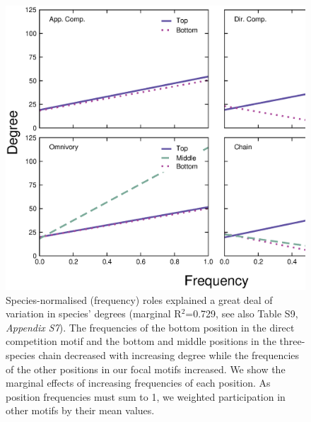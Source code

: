 \documentclass[12pt]{article}
\begin{document}
    \begin{figure}[ht!]
        \centering
        \includegraphics[width=\textwidth]{figures/positions_vs_Deg_freq.eps}
        \caption{Species-normalised (frequency) roles explained a great deal of variation in species' degrees (marginal R$^2$=0.729, see also Table S9, \emph{Appendix S7}). The frequencies of the bottom position in the direct competition motif and the bottom and middle positions in the three-species chain decreased with increasing degree while the frequencies of the other positions in our focal motifs increased. We show the marginal effects of increasing frequencies of each position. As position frequencies must sum to 1, we weighted participation in other motifs by their mean values.}
        \label{fig:positions_deg}
    \end{figure}

\clearpage
\end{document}
